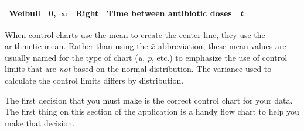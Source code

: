 \documentclass[12pt,openany]{book}
\numberwithin{dummy}{section}
\theoremstyle{ocrenumbox}
\theoremstyle{ocrenumb}
\theoremstyle{blacknumex}
\theoremstyle{blacknumbox}
\theoremstyle{ocrenum}
\begin{document}
\begin{longtable}[]{@{}llllll@{}}
\begin{minipage}[t]{0.22\columnwidth}
Weibull\strut
\end{minipage} & \begin{minipage}[t]{0.09\columnwidth}\raggedright
0, \(\infty\)\strut
\end{minipage} & \begin{minipage}[t]{0.07\columnwidth}\raggedright
Right\strut
\end{minipage} & \begin{minipage}[t]{0.13\columnwidth}\raggedright
Time between antibiotic doses\strut
\end{minipage} & \begin{minipage}[t]{0.16\columnwidth}\raggedright
\emph{t}\strut
\end{minipage}\tabularnewline
\bottomrule
\end{longtable}

When control charts use the mean to create the center line, they use the arithmetic mean. Rather than using the \(\bar{x}\) abbreviation, these mean values are usually named for the type of chart (\emph{u}, \emph{p}, etc.) to emphasize the use of control limits that are \emph{not} based on the normal distribution. The variance used to calculate the control limits differs by distribution.

The first decision that you must make is the correct control chart for your data. The first thing on this section of the application is a handy flow chart to help you make that decision.
\end{document}
